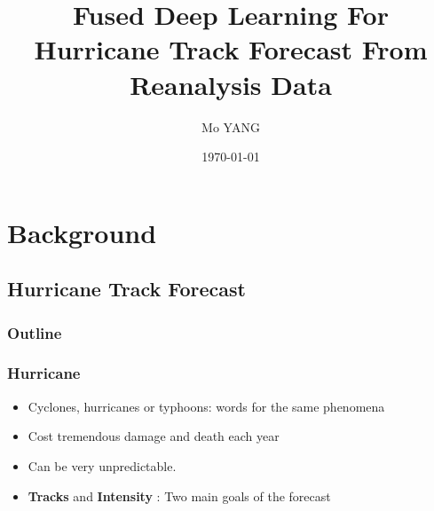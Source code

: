 \documentclass{beamer}
\title[About Beamer] %
{Fused Deep Learning For Hurricane Track Forecast From Reanalysis Data}
\author{Mo YANG}
\institute[u-psud] %
{
	Supervisor: \\ %
	\medskip
	Claire Monteleoni
	\\
	Guillaume Charpiat 
	\\
	Sophie Giffard-Roison
}
\date{\today} %
\begin{document}
\begin{frame}
\titlepage %
\end{frame}



\section{Background} %
\subsection{Hurricane Track Forecast}

\begin{frame}
\frametitle{Outline} %
\tableofcontents[currentsection] %
\end{frame}


\begin{frame}
\frametitle{Hurricane}
\begin{itemize}
\item Cyclones, hurricanes or typhoons: words for the same phenomena
\item Cost tremendous damage and death each year
\item Can be very unpredictable.
\item \textbf{Tracks} and \textbf{Intensity} : Two main goals of the forecast
\end{itemize}
\end{frame}
\end{document}
